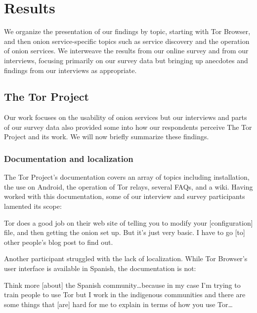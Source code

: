 \section{Results}
\label{sec:results}

We organize the presentation of our findings by topic, starting with Tor
Browser, and then onion service-specific topics such as service discovery and
the operation of onion services.  We interweave the results from our online
survey and from our interviews, focusing primarily on our survey data but
bringing up anecdotes and findings from our interviews as appropriate.

\subsection{The Tor Project}

Our work focuses on the usability of onion services but our interviews and parts
of our survey data also provided some into how our respondents perceive The Tor
Project and its work.  We will now briefly summarize these findings.

\subsubsection{Documentation and localization}

The Tor Project's documentation covers an array of topics including
installation, the use on Android, the operation of Tor relays, several FAQs, and
a wiki.  Having worked with this documentation, some of our interview and survey
participants lamented its scope:

\begin{displayquote}[P14]
Tor does a good job on their web site of telling you to modify your
[configuration] file, and then getting the onion set up.  But it's just very
basic.  I have to go [to] other people's blog post to find out.
\end{displayquote}

Another participant struggled with the lack of localization.  While Tor
Browser's user interface is available in Spanish, the documentation is not:

\begin{displayquote}[P11]
Think more [about] the Spanish community\dots because in my case I'm trying to
train people to use Tor but I work in the indigenous communities and there are
some things that [are] hard for me to explain in terms of how you use Tor\dots
\end{displayquote}

